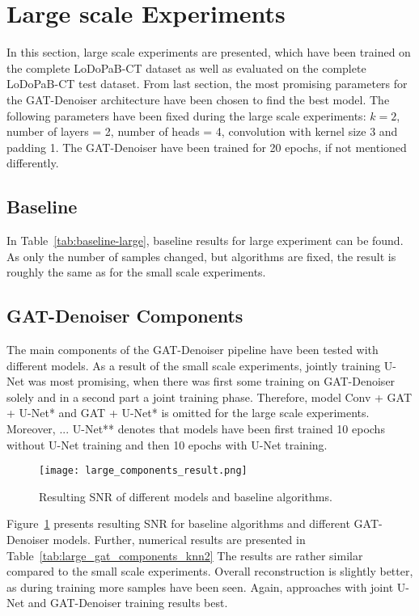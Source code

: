 \section{Large scale Experiments}

In this section, large scale experiments are presented, which have been trained on the complete LoDoPaB-CT dataset
as well as evaluated on the complete LoDoPaB-CT test dataset.
From last section, the most promising parameters for the GAT-Denoiser architecture have been chosen
to find the best model. The following parameters have been fixed during the large scale experiments:
$k=2$, number of layers = 2, number of heads = 4, convolution with kernel size 3 and padding 1.
The GAT-Denoiser have been trained for 20 epochs, if not mentioned differently.


\subsection{Baseline}
In Table~\ref{tab:baseline-large}, baseline results for large experiment can be found.
As only the number of samples changed, but algorithms are fixed, the result is roughly 
the same as for the small scale experiments.

\subsection{GAT-Denoiser Components}
The main components of the GAT-Denoiser pipeline have been tested with different models.
As a result of the small scale experiments, jointly training U-Net was most promising, 
when there was first some training on GAT-Denoiser solely and in a second part a joint training phase.
Therefore, model {Conv + GAT + U-Net*} and {GAT + U-Net*} is omitted for the large scale experiments.
Moreover, {... U-Net**} denotes that models have been first trained 10 epochs without
U-Net training and then 10 epochs with U-Net training.


\begin{figure}[H]
  \centering
  \texttt{[image: large\_components\_result.png]}
  \caption{Resulting SNR of different models and baseline algorithms.}
  \label{fig:large_components}
\end{figure}

Figure~\ref{fig:large_components} presents resulting SNR for baseline algorithms and 
different GAT-Denoiser models. Further, numerical results are presented in Table~\ref{tab:large_gat_components_knn2}
The results are rather similar compared to the small scale experiments.
Overall reconstruction is slightly better, as during training more samples have been seen.
Again, approaches with joint U-Net and GAT-Denoiser training results best.

